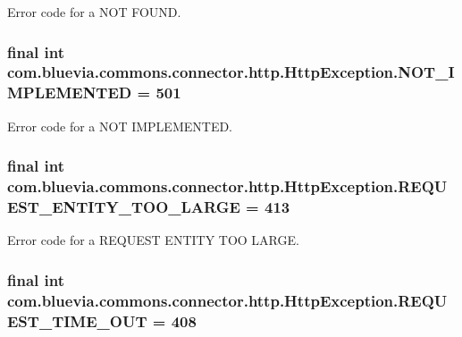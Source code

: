 \label{classcom_1_1bluevia_1_1commons_1_1connector_1_1http_1_1HttpException_a3a00e30288263a38733c41145867be6d}
Error code for a NOT FOUND. \hypertarget{classcom_1_1bluevia_1_1commons_1_1connector_1_1http_1_1HttpException_a0deb5ee8bce98bd280111e01c0ba79f6}{
\subsubsection[{NOT\_\-IMPLEMENTED}]{\setlength{\rightskip}{0pt plus 5cm}final int {\bf com.bluevia.commons.connector.http.HttpException.NOT\_\-IMPLEMENTED} = 501}}
\label{classcom_1_1bluevia_1_1commons_1_1connector_1_1http_1_1HttpException_a0deb5ee8bce98bd280111e01c0ba79f6}
Error code for a NOT IMPLEMENTED. \hypertarget{classcom_1_1bluevia_1_1commons_1_1connector_1_1http_1_1HttpException_aaf8b36a8e3c30a77eba0827d33ceadf7}{
\subsubsection[{REQUEST\_\-ENTITY\_\-TOO\_\-LARGE}]{\setlength{\rightskip}{0pt plus 5cm}final int {\bf com.bluevia.commons.connector.http.HttpException.REQUEST\_\-ENTITY\_\-TOO\_\-LARGE} = 413}}
\label{classcom_1_1bluevia_1_1commons_1_1connector_1_1http_1_1HttpException_aaf8b36a8e3c30a77eba0827d33ceadf7}
Error code for a REQUEST ENTITY TOO LARGE. \hypertarget{classcom_1_1bluevia_1_1commons_1_1connector_1_1http_1_1HttpException_a03f7ad83a523e45f27f95a168ecebab6}{
\subsubsection[{REQUEST\_\-TIME\_\-OUT}]{\setlength{\rightskip}{0pt plus 5cm}final int {\bf com.bluevia.commons.connector.http.HttpException.REQUEST\_\-TIME\_\-OUT} = 408}}
